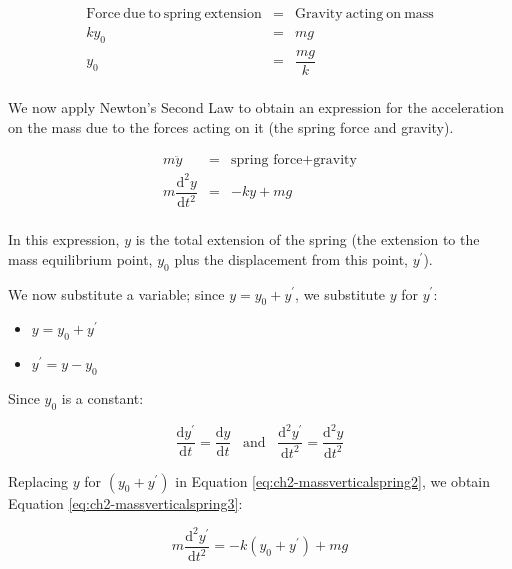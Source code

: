 \documentclass[
]{book}
\providecommand{\tightlist}{%
  \setlength{\itemsep}{0pt}\setlength{\parskip}{0pt}}
\begin{document}
\begin{equation}
\begin{array}{rcl}
\mathrm{Force~due~to~spring~extension} &=& \mathrm{Gravity~acting~on~mass}\\
k y_0 &=& mg\\
y_0 &=& \dfrac{mg}{k}\\
\end{array}
\label{eq:ch2-massverticalspring1}
\end{equation}

We now apply Newton's Second Law to obtain an expression for the acceleration on the mass due to the forces acting on it (the spring force and gravity).

\begin{equation}
\begin{array}{rcl}
m\ddot{y}&=&  \textrm{spring force} + \textrm{gravity} \\
m\dfrac{\mathrm{d}^2 y}{\mathrm{d} t^2} &=& -ky + mg\\
\end{array}
\label{eq:ch2-massverticalspring2}
\end{equation}

In this expression, \(y\) is the total extension of the spring (the extension to the mass equilibrium point, \(y_0\) plus the displacement from this point, \(y^\prime\)).

We now substitute a variable; since \(y = y_0 + y^\prime\), we substitute \(y\) for \(y^\prime\):

\begin{itemize}
\tightlist
\item
  \(y = y_0 + y^\prime\)
\item
  \(y^\prime = y - y_0\)
\end{itemize}

Since \(y_0\) is a constant:

\begin{equation}
\dfrac{\mathrm{d} y^\prime}{\mathrm{d} t} = \dfrac{\mathrm{d} y}{\mathrm{d} t} \hspace{10pt} \textrm{and} \hspace{10pt} \dfrac{\mathrm{d}^2 y^\prime}{\mathrm{d} t^2} = \dfrac{\mathrm{d}^2 y}{\mathrm{d} t^2}
\end{equation}

Replacing \(y\) for \((y_0 + y^\prime)\) in Equation \eqref{eq:ch2-massverticalspring2}, we obtain Equation \eqref{eq:ch2-massverticalspring3}:

\begin{equation}
m\dfrac{\mathrm{d}^2 y^\prime}{\mathrm{d} t^2} = -k(y_0 + y^\prime) + mg
\label{eq:ch2-massverticalspring3}
\end{equation}
\end{document}
